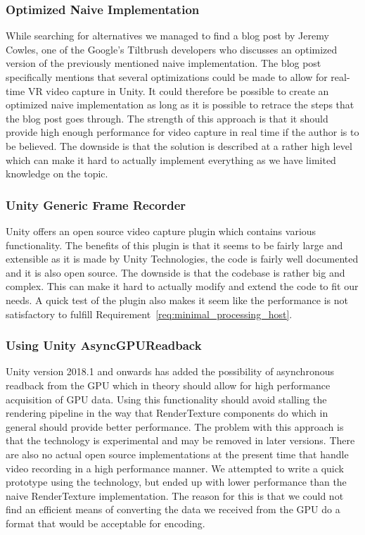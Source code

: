 \subsubsection{Optimized Naive Implementation}
While searching for alternatives we managed to find a blog post\cite{google_vrCaptureBlog} by Jeremy Cowles, one of the Google's Tiltbrush developers who discusses an optimized version of the previously mentioned naive implementation. The blog post specifically mentions that several optimizations could be made to allow for real-time VR video capture in Unity. It could therefore be possible to create an optimized naive implementation as long as it is possible to retrace the steps that the blog post goes through. The strength of this approach is that it should provide high enough performance for video capture in real time if the author is to be believed. The downside is that the solution is described at a rather high level which can make it hard to actually implement everything as we have limited knowledge on the topic. 

\subsubsection{Unity Generic Frame Recorder}
Unity offers an open source video capture plugin\cite{unity_genericFrameRecprder} which contains various functionality. The benefits of this plugin is that it seems to be fairly large and extensible as it is made by Unity Technologies, the code is fairly well documented and it is also open source. The downside is that the codebase is rather big and complex. This can make it hard to actually modify and extend the code to fit our needs. A quick test of the plugin also makes it seem like the performance is not satisfactory to fulfill Requirement~\ref{req:minimal_processing_host}.

\subsubsection{Using Unity AsyncGPUReadback}
Unity version 2018.1 and onwards has added the possibility of asynchronous readback from the GPU\cite{unity_asyncReadback} which in theory should allow for high performance acquisition of GPU data. Using this functionality should avoid stalling the rendering pipeline in the way that RenderTexture components do which in general should provide better performance. The problem with this approach is that the technology is experimental and may be removed in later versions. There are also no actual open source implementations at the present time that handle video recording in a high performance manner. We attempted to write a quick prototype using the technology, but ended up with lower performance than the naive RenderTexture implementation. The reason for this is that we could not find an efficient means of converting the data we received from the GPU do a format that would be acceptable for encoding. 

